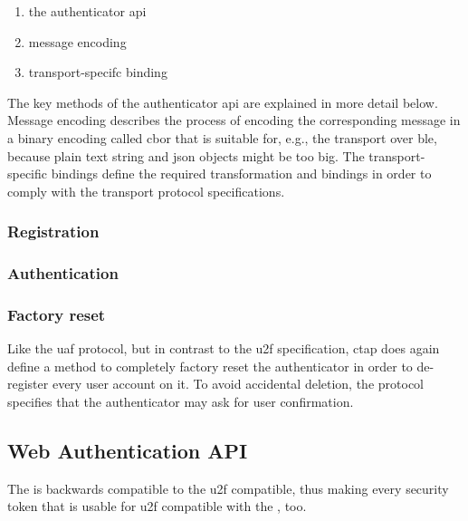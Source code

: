 \begin{enumerate}
	\item the authenticator \gls{api}
	\item message encoding
	\item transport-specifc binding
\end{enumerate}

The key methods of the authenticator \gls{api} are explained in more detail below. Message encoding describes the process of encoding the corresponding message in a binary encoding called \gls{cbor} that is suitable for, e.g., the transport over \gls{ble}, because plain text string and \gls{json} objects might be too big. The transport-specific bindings define the required transformation and bindings in order to comply with the transport protocol specifications.

\subsubsection{Registration}



\subsubsection{Authentication}

\subsubsection{Factory reset}

Like the \gls{uaf} protocol, but in contrast to the \gls{u2f} specification, \gls{ctap} does again define a method to completely factory reset the authenticator in order to de-register every user account on it. To avoid accidental deletion, the protocol specifies that the authenticator may ask for user confirmation. 

\subsection{Web Authentication API}

The \wa{} is backwards compatible to the \gls{u2f} compatible, thus making every security token that is usable for \gls{u2f} compatible with the \wa, too.
